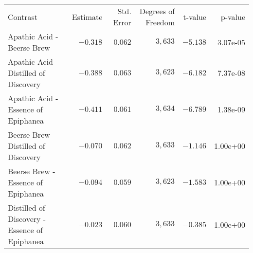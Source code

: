 \begin{longtable}{>{\raggedright\arraybackslash}p{350px}rrrrr}
\caption*{
{\large Contrast Results} \\ 
{\small Estimated Marginal Means Contrasts}
} \\ 
\toprule
Contrast & Estimate & Std. Error & Degrees of Freedom & t-value & p-value \\ 
\midrule\addlinespace[2.5pt]
Apathic Acid - Beerse Brew & $-0.318$ & $0.062$ & $3,633$ & $-5.138$ & 3.07e-05 \\ 
Apathic Acid - Distilled of Discovery & $-0.388$ & $0.063$ & $3,623$ & $-6.182$ & 7.37e-08 \\ 
Apathic Acid - Essence of Epiphanea & $-0.411$ & $0.061$ & $3,634$ & $-6.789$ & 1.38e-09 \\ 
Beerse Brew - Distilled of Discovery & $-0.070$ & $0.062$ & $3,633$ & $-1.146$ & 1.00e+00 \\ 
Beerse Brew - Essence of Epiphanea & $-0.094$ & $0.059$ & $3,623$ & $-1.583$ & 1.00e+00 \\ 
Distilled of Discovery - Essence of Epiphanea & $-0.023$ & $0.060$ & $3,633$ & $-0.385$ & 1.00e+00 \\ 
\bottomrule
\end{longtable}

